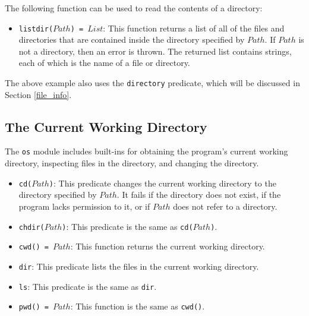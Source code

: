 The following function can be used to read the contents of a directory:
\begin{itemize}
\item \texttt{listdir($Path$) = $List$}: This function returns a list of all of the files and directories that are contained inside the directory specified by $Path$.  If $Path$ is not a directory, then an error is thrown.  The returned list contains strings, each of which is the name of a file or directory.
\end{itemize}
The above example also uses the \texttt{directory} predicate, which will be discussed in Section \ref{file_info}.

\subsection{The Current Working Directory}
The \texttt{os} module includes built-ins for obtaining the program's current working directory, inspecting files in the directory, and changing the directory.
\begin{itemize}
\item \texttt{cd($Path$)}: This predicate changes the current working directory to the directory specified by $Path$. It fails if the directory does not exist, if the program lacks permission to it, or if $Path$ does not refer to a directory.
\item \texttt{chdir($Path$)}: This predicate is the same as \texttt{cd($Path$)}.
\item \texttt{cwd() = $Path$}: This function returns the current working directory.
\item \texttt{dir}: This predicate lists the files in the current working directory.
\item \texttt{ls}: This predicate is the same as \texttt{dir}.
\item \texttt{pwd() = $Path$}:  This function is the same as \texttt{cwd()}.
\end{itemize}

